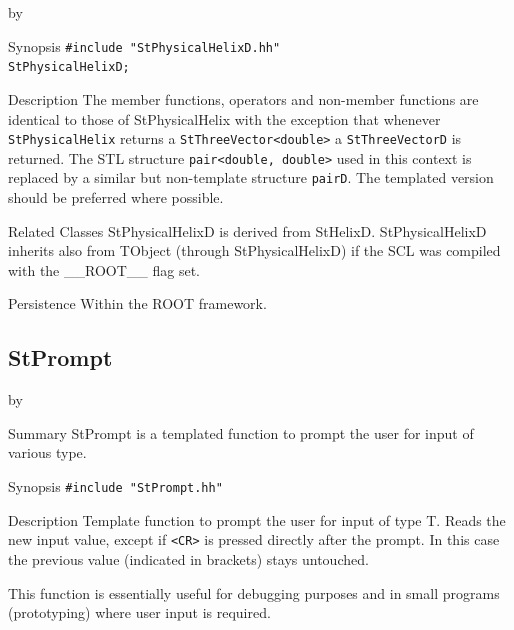 \documentclass[twoside]{article}
\newcommand{\name}[1]{\textsf{#1}}%
\newcommand{\entrylabel}[1]{\mbox{\textbf{{#1}}}\hfil}%
\newenvironment{entry}
{\begin{list}{}%
    {\renewcommand{\makelabel}{\entrylabel}%
     \setlength{\labelwidth}{90pt}%
     \setlength{\leftmargin}{\labelwidth}
     \advance\leftmargin by \labelsep%
      }%
    }%
  {\end{list}}
\newcommand{\Entrylabel}[1]%
{\raisebox{0pt}[1ex][0pt]{\makebox[\labelwidth][l]%
    {\parbox[t]{\labelwidth}{\hspace{0pt}\textbf{{#1}}}}}}
\newenvironment{Entry}%
{\renewcommand{\entrylabel}{\Entrylabel}\begin{entry}}%
  {\end{entry}}
\begin{document}
\begin{description}
\begin{Entry}
\item[Synopsis]
    \verb+#include "StPhysicalHelixD.hh"+ \\
    \verb+StPhysicalHelixD;+
    
    
\item[Description]       
    The member functions, operators and non-member functions are identical
    to those of StPhysicalHelix with the exception that whenever \texttt{StPhysicalHelix} returns a
    \verb+StThreeVector<double>+ a \texttt{StThreeVectorD} is returned.
    The STL structure \verb+pair<double, double>+ used in this context is replaced
    by a similar but non-template structure \texttt{pairD}. 
    The templated version should be preferred where possible.

\item[Related Classes]
    StPhysicalHelixD is derived from StHelixD.
    StPhysicalHelixD inherits also from TObject (through StPhysicalHelixD) 
    if the SCL was compiled with the \name{\_\_ROOT\_\_} flag set.
    
\item[Persistence]
    Within the ROOT framework.

\end{Entry}


\clearpage

%
%
\subsection{StPrompt } \label{ref:StPrompt}
\begin{Entry}
\item[Summary]
    StPrompt is a templated function to prompt the user for input of
    various type.
    
\item[Synopsis]
    \verb+#include "StPrompt.hh"+
    
  
\item[Description]   
  Template function to prompt the user for input of type T.
  Reads the new input value, except if \verb+<CR>+ is 
  pressed directly after the prompt. In this case the
  previous value (indicated in brackets) stays untouched.

  This function is essentially useful for debugging purposes and in small
  programs (prototyping) where user input is required.
  

\end{Entry}
\end{description}
\end{document}
